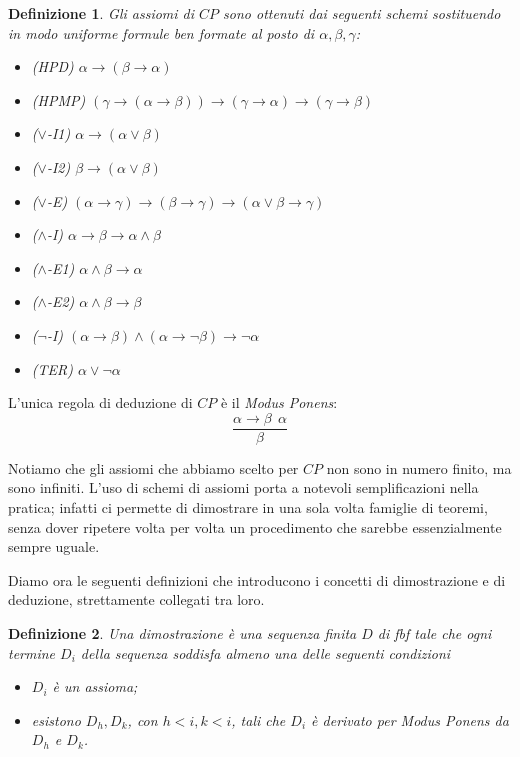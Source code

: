 \documentclass[a4paper, 12pt]{article}
\newtheorem{definition}{Definizione}
\begin{document}
\begin{definition}
Gli assiomi di $CP$ sono ottenuti dai seguenti schemi
sostituendo in modo uniforme formule ben formate al posto di $\alpha, \beta, \gamma$:
\begin{itemize}
\item (HPD) $\alpha \rightarrow (\beta \rightarrow \alpha)$
\item (HPMP) $(\gamma \rightarrow (\alpha \rightarrow \beta)) \rightarrow (\gamma \rightarrow \alpha) \rightarrow (\gamma \rightarrow \beta)$
\item ($\lor$-I1) $\alpha \rightarrow (\alpha \lor \beta)$
\item ($\lor$-I2) $\beta \rightarrow (\alpha \lor \beta)$
\item ($\lor$-E) $(\alpha \rightarrow \gamma) \rightarrow (\beta \rightarrow \gamma) \rightarrow (\alpha \lor \beta \rightarrow \gamma)$
\item ($\land$-I) $\alpha \rightarrow \beta \rightarrow \alpha \land \beta$
\item ($\land$-E1) $\alpha \land \beta \rightarrow \alpha$
\item ($\land$-E2) $\alpha \land \beta \rightarrow \beta$
\item ($\neg$-I) $(\alpha \rightarrow \beta) \land (\alpha \rightarrow \neg \beta) \rightarrow \neg \alpha$
\item (TER) $\alpha \lor \neg \alpha$
\end{itemize}
\end{definition}

L'unica regola di deduzione di $CP$ è il \textit{Modus Ponens}:
$$\frac{\alpha \rightarrow \beta \ \ \alpha}{\beta}$$

Notiamo che gli assiomi che abbiamo scelto per $CP$ non sono in numero finito,
ma sono infiniti. L'uso di schemi di assiomi porta a notevoli semplificazioni
nella pratica; infatti ci permette di dimostrare in una sola volta famiglie di teoremi,
senza dover ripetere volta per volta un procedimento che sarebbe essenzialmente sempre uguale.

Diamo ora le seguenti definizioni che introducono i concetti di dimostrazione e di
deduzione, strettamente collegati tra loro.

\begin{definition}
Una dimostrazione è una sequenza finita $D$ di fbf tale che
ogni termine $D_i$ della sequenza soddisfa almeno una delle seguenti condizioni
\begin{itemize}
\item $D_i$ è un assioma;
\item esistono $D_h, D_k$, con $h < i, k < i$, tali che $D_i$ è derivato per \textit{Modus Ponens}
da $D_h$ e $D_k$.
\end{itemize}
\end{definition}
\end{document}
